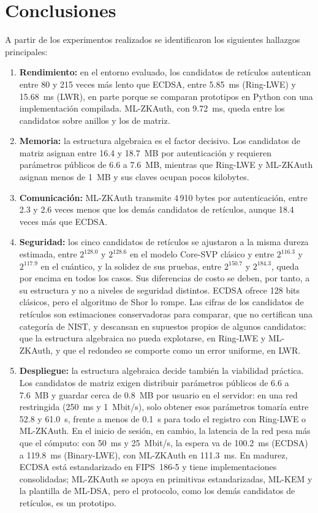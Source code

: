 \section{Conclusiones}

A partir de los experimentos realizados se identificaron los siguientes hallazgos
principales:

\begin{enumerate}
    \item \textbf{Rendimiento:} en el entorno evaluado, los candidatos de retículos autentican entre 80 y 215 veces más lento que ECDSA, entre 5.85~ms (Ring-LWE) y 15.68~ms (LWR), en parte porque se comparan prototipos en Python con una implementación compilada. ML-ZKAuth, con 9.72~ms, queda entre los candidatos sobre anillos y los de matriz.

    \item \textbf{Memoria:} la estructura algebraica es el factor decisivo. Los candidatos de matriz asignan entre 16.4 y 18.7~MB por autenticación y requieren parámetros públicos de 6.6 a 7.6~MB, mientras que Ring-LWE y ML-ZKAuth asignan menos de 1~MB y sus claves ocupan pocos kilobytes.

    \item \textbf{Comunicación:} ML-ZKAuth transmite 4\,910 bytes por autenticación, entre 2.3 y 2.6 veces menos que los demás candidatos de retículos, aunque 18.4 veces más que ECDSA.

    \item \textbf{Seguridad:} los cinco candidatos de retículos se ajustaron a la misma dureza estimada, entre $2^{128.0}$ y $2^{128.6}$ en el modelo Core-SVP clásico y entre $2^{116.3}$ y $2^{117.9}$ en el cuántico, y la solidez de sus pruebas, entre $2^{150.7}$ y $2^{184.3}$, queda por encima en todos los casos. Sus diferencias de costo se deben, por tanto, a su estructura y no a niveles de seguridad distintos. ECDSA ofrece 128 bits clásicos, pero el algoritmo de Shor lo rompe. Las cifras de los candidatos de retículos son estimaciones conservadoras para comparar, que no certifican una categoría de NIST, y descansan en supuestos propios de algunos candidatos: que la estructura algebraica no pueda explotarse, en Ring-LWE y ML-ZKAuth, y que el redondeo se comporte como un error uniforme, en LWR.

    \item \textbf{Despliegue:} la estructura algebraica decide también la viabilidad práctica. Los candidatos de matriz exigen distribuir parámetros públicos de 6.6 a 7.6~MB y guardar cerca de 0.8~MB por usuario en el servidor: en una red restringida (250~ms y 1~Mbit/s), solo obtener esos parámetros tomaría entre 52.8 y 61.0~s, frente a menos de 0.1~s para todo el registro con Ring-LWE o ML-ZKAuth. En el inicio de sesión, en cambio, la latencia de la red pesa más que el cómputo: con 50~ms y 25~Mbit/s, la espera va de 100.2~ms (ECDSA) a 119.8~ms (Binary-LWE), con ML-ZKAuth en 111.3~ms. En madurez, ECDSA está estandarizado en FIPS~186-5 y tiene implementaciones consolidadas; ML-ZKAuth se apoya en primitivas estandarizadas, ML-KEM y la plantilla de ML-DSA, pero el protocolo, como los demás candidatos de retículos, es un prototipo.


\end{enumerate}
